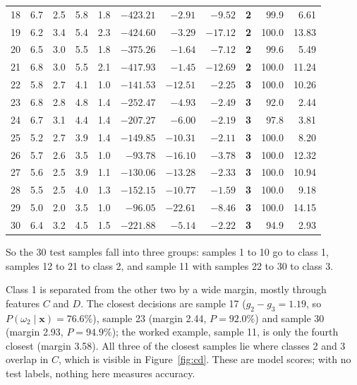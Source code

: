 \begin{table}[htbp]
\begin{tabular}{@{}rrrrrrrrrrr@{}}
18 & 6.7 & 2.5 & 5.8 & 1.8 & $-423.21$ & $-2.91$ & $-9.52$ & \textbf{2} & 99.9 & 6.61 \\
19 & 6.2 & 3.4 & 5.4 & 2.3 & $-424.60$ & $-3.29$ & $-17.12$ & \textbf{2} & 100.0 & 13.83 \\
20 & 6.5 & 3.0 & 5.5 & 1.8 & $-375.26$ & $-1.64$ & $-7.12$ & \textbf{2} & 99.6 & 5.49 \\
21 & 6.8 & 3.0 & 5.5 & 2.1 & $-417.93$ & $-1.45$ & $-12.69$ & \textbf{2} & 100.0 & 11.24 \\
22 & 5.8 & 2.7 & 4.1 & 1.0 & $-141.53$ & $-12.51$ & $-2.25$ & \textbf{3} & 100.0 & 10.26 \\
23 & 6.8 & 2.8 & 4.8 & 1.4 & $-252.47$ & $-4.93$ & $-2.49$ & \textbf{3} & 92.0 & 2.44 \\
24 & 6.7 & 3.1 & 4.4 & 1.4 & $-207.27$ & $-6.00$ & $-2.19$ & \textbf{3} & 97.8 & 3.81 \\
25 & 5.2 & 2.7 & 3.9 & 1.4 & $-149.85$ & $-10.31$ & $-2.11$ & \textbf{3} & 100.0 & 8.20 \\
26 & 5.7 & 2.6 & 3.5 & 1.0 & $-93.78$ & $-16.10$ & $-3.78$ & \textbf{3} & 100.0 & 12.32 \\
27 & 5.6 & 2.5 & 3.9 & 1.1 & $-130.06$ & $-13.28$ & $-2.33$ & \textbf{3} & 100.0 & 10.94 \\
28 & 5.5 & 2.5 & 4.0 & 1.3 & $-152.15$ & $-10.77$ & $-1.59$ & \textbf{3} & 100.0 & 9.18 \\
29 & 5.0 & 2.0 & 3.5 & 1.0 & $-96.05$ & $-22.61$ & $-8.46$ & \textbf{3} & 100.0 & 14.15 \\
30 & 6.4 & 3.2 & 4.5 & 1.5 & $-221.88$ & $-5.14$ & $-2.22$ & \textbf{3} & 94.9 & 2.93 \\
\bottomrule
\end{tabular}
\end{table}

So the 30 test samples fall into three groups: samples 1 to 10 go to class 1, samples 12 to 21 to class 2, and sample 11 with
samples 22 to 30 to class 3.

Class 1 is separated from the other two by a wide margin, mostly through features $C$ and $D$. The closest decisions are
sample 17 ($g_2 - g_3 = 1.19$, so $P(\omega_2\mid\mathbf{x}) = 76.6\%$), sample 23 (margin 2.44, $P = 92.0\%$) and sample 30
(margin 2.93, $P = 94.9\%$); the worked example, sample 11, is only the fourth closest (margin 3.58). All three of the closest
samples lie where classes 2 and 3 overlap in $C$, which is visible in Figure~\ref{fig:cd}. These are model scores; with no test
labels, nothing here measures accuracy.

